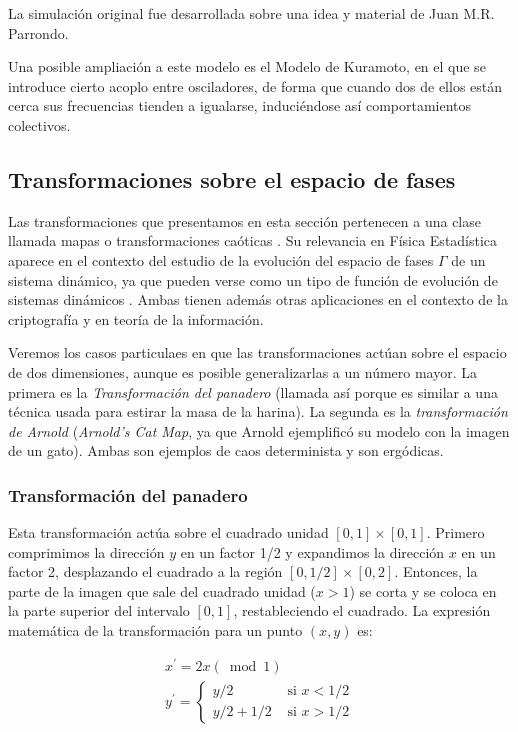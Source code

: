 \documentclass[11pt, a4paper]{article} %
\theoremstyle{named}
\begin{document}
La simulación original fue desarrollada sobre una idea y material de Juan M.R. Parrondo.

Una posible ampliación a este modelo es el Modelo de Kuramoto, en el que se introduce cierto acoplo entre osciladores, de forma que cuando dos de ellos están cerca sus frecuencias tienden a igualarse, induciéndose así comportamientos colectivos.

\subsection{Transformaciones sobre el espacio de fases}\label{sec:transformations}

Las transformaciones que presentamos en esta sección pertenecen a una clase llamada mapas o transformaciones caóticas \cite{dyson}. Su relevancia en Física Estadística aparece en el contexto del estudio de la evolución del espacio de fases $\Gamma$ de un sistema dinámico, ya que pueden verse como un tipo de función de evolución de sistemas dinámicos \cite{dorfman}. Ambas tienen además otras aplicaciones en el contexto de la criptografía y en teoría de la información.

Veremos los casos particulaes en que las transformaciones actúan sobre el espacio de dos dimensiones, aunque es posible generalizarlas a un número mayor. La primera es la \textit{Transformación del panadero} (llamada así porque es similar a una técnica usada para estirar la masa de la harina). La segunda es la \textit{transformación de Arnold} (\textit{Arnold's Cat Map}, ya que Arnold ejemplificó su modelo con la imagen de un gato). Ambas son ejemplos de caos determinista y son ergódicas.

\subsubsection{Transformación del panadero}\label{sec:panadero}

Esta transformación actúa sobre el cuadrado unidad $[0,1] \times [0,1]$. Primero comprimimos la dirección $y$ en un factor 1/2 y expandimos la dirección $x$ en un factor 2, desplazando el cuadrado a la región $[0,1/2] \times [0,2]$. Entonces, la parte de la imagen que sale del cuadrado unidad ($x >1$) se corta y se coloca en la parte superior del intervalo $[0,1]$, restableciendo el cuadrado. La expresión matemática de la transformación para un punto $(x,y)$ es:

\begin{equation}\label{eq:panadero}
\begin{array}{l}
{x^{\prime}=2 x(\bmod 1)} \\
y^{\prime}=\left\{
\begin{array}{ll}
{y / 2} & {\text { si } x<1 / 2} \\
{y / 2+1 / 2} & {\text { si } x>1 / 2}
\end{array}\right.
\end{array}
\end{equation}
\end{document}
